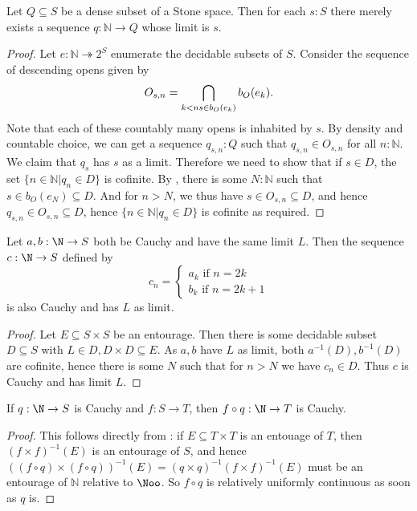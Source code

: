 \begin{lemma}
  Let $Q\subseteq S$ be a dense subset of a Stone space.
  Then for each $s:S$ there merely exists a sequence $q:\mathbb N \to Q$ whose limit is $s$. 
\end{lemma}
\begin{proof}
  Let $e:\mathbb N \twoheadrightarrow 2^S$ enumerate the decidable subsets of $S$. Consider the sequence of descending opens given by
  $$
  O_{s,n} = \bigcap_{k<n \\ s \in b_O(e_k)} b_O(e_k).
  $$
  Note that each of these countably many opens is inhabited by $s$. By density and countable choice, we can get a sequence $q_{s,n}:Q$ such that $q_{s,n} \in O_{s,n}$ for all $n:\mathbb N$. 
  We claim that $q_s$ has $s$ as a limit. Therefore we need to show that if $s\in D$, the set $\{n \in \mathbb N | q_n \in D\}$ is cofinite. 
  By , there is some $N:\mathbb N$ such that $s\in b_O(e_N)\subseteq D$. And for $n>N$, we thus have $s\in O_{s,n} \subseteq D$, and hence $q_{s,n}\in O_{s,n}\subseteq D$, hence $\{n \in \mathbb N | q_n \in D\}$ is cofinite as required. 
\end{proof}
\begin{lemma}
  Let $a,b : \N \to S$ both be Cauchy and have the same limit $L$. Then the sequence $c: \N \to S$ defined by
  $$
  c_n = \begin{cases} 
    a_k \text{ if } n = 2k\\
    b_k \text{ if } n = 2k+1
  \end{cases}
  $$
  is also Cauchy and has $L$ as limit. 
\end{lemma}
\begin{proof}
  Let $E\subseteq S \times S$ be an entourage. Then there is some decidable subset $D\subseteq S$ with $L \in D, D \times D \subseteq E$. As $a,b$ have $L$ as limit, both $a^{-1}(D), b^{-1}(D)$ are cofinite, hence there is some $N$ such that for $n>N$ we have $c_n \in D$. Thus $c$ is Cauchy and has limit $L$. 
\end{proof}

\begin{lemma}
  If $q: \N \to S$ is Cauchy and $f: S \to T$, then $f \circ q : \N \to T$ is Cauchy. 
\end{lemma}
\begin{proof}
  This follows directly from : if $E\subseteq T \times T$ is an entouage of $T$, then $(f \times f)^{-1}(E)$ is an entourage of $S$, and hence $ ((f \circ q) \times (f \circ q))^{-1}(E) = (q \times q)^{-1}(f\times f)^{-1} (E)$ must be an entourage of $\mathbb N $ relative to $\Noo$. So $f \circ q$ is relatively uniformly continuous as soon as $q$ is. 
\end{proof}

